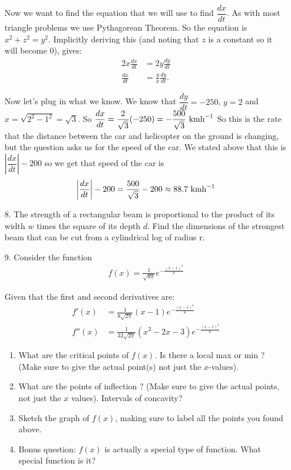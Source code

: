 \documentclass[11pt,reqno]{article}
\theoremstyle{definition}
\begin{document}
\begin{enumerate}
		Now we want to find the equation that we will use to find $\dfrac{dx}{dt}$. As with most triangle problems we use Pythagorean Theorem. So the equation is $x^2 + z^2 = y^2$. Implicitly deriving this (and noting that $z$ is a constant so it will become 0), gives:
		\begin{align*}
			2x \frac{dx}{dt} &= 2y\frac{dy}{dt} \\
			\frac{dx}{dt} &= \frac{y}{x} \frac{dy}{dt}.
		\end{align*}
		
		Now let's plug in what we know. We know that $\dfrac{dy}{dt} = -250$, $y = 2$ and $x = \sqrt{2^2 - 1^2} = \sqrt{3}$. So $\dfrac{dx}{dt} = \dfrac{2}{\sqrt{3}} (-250) = -\dfrac{500}{\sqrt{3}} \textnormal{ kmh}^{-1}$ So this is the rate that the distance between the car and helicopter on the ground is changing, but the question asks us for the speed of the car. We stated above that this is $\left|\dfrac{dx}{dt}\right| - 200$ so we get that speed of the car is 
		\begin{align*}
			\left|\dfrac{dx}{dt}\right| - 200 = \frac{500}{\sqrt{3}} - 200 \approx 88.7 \textnormal{ kmh}^{-1}
		\end{align*} 
		
		\newpage
		\item[8.] The strength of a rectangular beam is proportional to the product of its width $w$ times the square of its depth $d$. Find the dimensions of the strongest beam that can be cut from a cylindrical log of radius r.
		\item[9.] Consider the function
		\begin{align*}
			f(x) = \frac{1}{\sqrt{8 \pi}} e^{- \frac{(x - 1)^2}{8}}
		\end{align*}
		
		Given that the first and second derivatives are:
		\begin{align*}
			f'(x) &= \frac{1}{8 \sqrt{2 \pi}} (x - 1) e^{- \frac{(x - 1)^2}{8}} \\
			f''(x) &= \frac{1}{32 \sqrt{2 \pi}} (x^2 - 2x - 3) e^{- \frac{(x - 1)^2}{8}}
		\end{align*}
		
		\begin{enumerate}
			\item What are the critical points of $f(x)$. Is there a local max or min ? (Make sure to give the actual point(s) not just the $x$-values). 
			\item What are the points of inflection ? (Make sure to give the actual points, not just the $x$ values). Intervals of concavity? 
			\item Sketch the graph of $f(x)$, making sure to label all the points you found above. 
			\item Bonus question: $f(x)$ is actually a special type of function. What special function is it? 
		\end{enumerate}
		

\end{enumerate}
\end{document}
